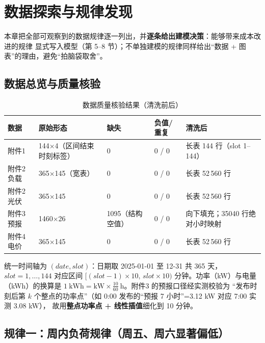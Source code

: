 \section{数据探索与规律发现}

本章把全部可观察到的数据规律逐一列出\nobreak，并\textbf{逐条给出建模决策}\nobreak：能够带来成本改进的规律
显式写入模型（第 5--8 节\nobreak）\nobreak；不单独建模的规律同样给出“数据 + 图表\nobreak”的理由\nobreak，避免“拍脑袋取舍\nobreak”\nobreak。

\subsection{数据总览与质量核验}

\begin{table}[htbp]
\centering
\caption{数据质量核验结果（清洗前后\nobreak）}
\label{tab:quality}
\begin{tabular}{@{}lllll@{}}
\toprule
数据 & 原始形态 & 缺失 & 负值/重复 & 清洗后 \\
\midrule
附件1 & 144$\times$4（区间结束时刻标签\nobreak） & 0 & 0 / 0 & 长表 144 行（slot 1--144\nobreak） \\
附件2 负载 & 365$\times$145（宽表\nobreak） & 0 & 0 / 0 & 长表 52\,560 行 \\
附件2 光伏 & 365$\times$145 & 0 & 0 / 0 & 长表 52\,560 行 \\
附件3 预报 & 1460$\times$26 & 1095（结构空值\nobreak） & 0 / 0 & 向下填充\nobreak；35040 行绝对小时映射 \\
附件4 电价 & 365$\times$145 & 0 & 0 / 0 & 长表 52\,560 行 \\
\bottomrule
\end{tabular}
\end{table}

统一时间轴为 $(date,slot)$\nobreak：日期取 2025-01-01 至 12-31 共 365 天\nobreak，$slot=1,\dots,144$
对应区间 $[(slot-1)\times10,\,slot\times10)$ 分钟\nobreak。功率（kW\nobreak）与电量（kWh\nobreak）的换算是
$1\ \text{kWh}=\text{kW}\times\frac{10}{60}\ \text{h}$\nobreak。附件3 的预报口径经实测校验为
“发布时刻后第 $k$ 个整点的功率点\nobreak”（如 0:00 发布的“预报 7 小时\nobreak”=3.12 kW 对应 7:00 实测 3.08 kW\nobreak）\nobreak，
故用\textbf{整点功率点 + 线性插值}细化到 10 分钟\nobreak。

\subsection{规律一\nobreak：周内负荷规律（周五\nobreak、周六显著偏低\nobreak）}

